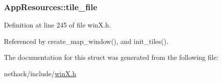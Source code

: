 \hypertarget{structAppResources_a7fb6f484113fc3cb8bc76fe9cc9fc05e}{
\subsubsection[{tile\+\_\+file}]{ App\+Resources\+::tile\+\_\+file}}\label{structAppResources_a7fb6f484113fc3cb8bc76fe9cc9fc05e}


Definition at line 245 of file win\+X.\+h.



Referenced by create\+\_\+map\+\_\+window(), and init\+\_\+tiles().



The documentation for this struct was generated from the following file\+:\begin{DoxyCompactItemize}
\item 
nethack/include/\hyperlink{winX_8h}{win\+X.\+h}\end{DoxyCompactItemize}
